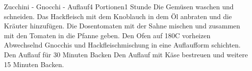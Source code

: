 \documentclass[twoside=true, DIV=16, 11pt,a4paper]{scrreprt}
\begin{document}
	\begin{recipe}{Zucchini - Gnocchi - Auflauf}{4 Portionen}{1 Stunde}
		Die Gemüsen waschen und schneiden.
		Das Hackfleisch mit dem Knoblauch in dem Öl anbraten und die Kräuter hinzufügen.
		Die Dosentomaten mit der Sahne mischen und zusammen mit den Tomaten in die Pfanne geben.
		\newstep
		Den Ofen auf 180\0C vorheizen
		\newstep
		Abwechselnd Gnocchis und Hackfleischmischung in eine Auflaufform schichten.
		\newstep
		Den Auflauf für 30 Minuten Backen
		Den Auflauf mit Käse bestreuen und weitere 15 Minuten Backen.
	\end{recipe}
\end{document}
